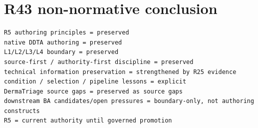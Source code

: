 \documentclass[11pt,a4paper]{article}
\begin{document}
\section{R43 non-normative conclusion}

\begin{ddtacore}[title={Cosa consolida questa candidate}]
\begin{lstlisting}
R5 authoring principles = preserved
native DDTA authoring = preserved
L1/L2/L3/L4 boundary = preserved
source-first / authority-first discipline = preserved
technical information preservation = strengthened by R25 evidence
condition / selection / pipeline lessons = explicit
DermaTriage source gaps = preserved as source gaps
downstream BA candidates/open pressures = boundary-only, not authoring constructs
R5 = current authority until governed promotion
\end{lstlisting}
\end{ddtacore}
\end{document}
